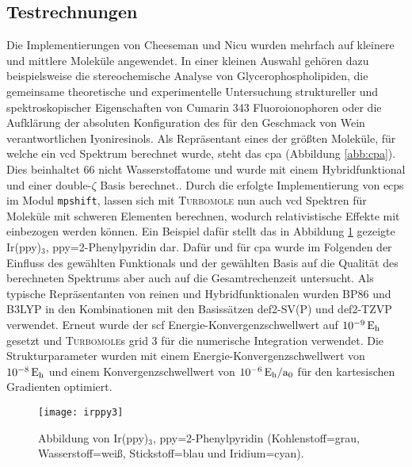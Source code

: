 	\subsection{Testrechnungen}
	Die Implementierungen von Cheeseman\supercite{cheeseman1996ab} und Nicu\supercite{nicu2008vibrational} wurden mehrfach auf kleinere und mittlere Moleküle angewendet. In einer kleinen Auswahl gehören dazu beispielsweise die stereochemische Analyse von Glycerophospholipiden\supercite{taniguchi2015stereochemical}, die gemeinsame theoretische und experimentelle Untersuchung struktureller und spektroskopischer Eigenschaften von Cumarin 343 Fluoroionophoren\supercite{botek2010theoretical} oder die Aufklärung der absoluten Konfiguration des für den Geschmack von Wein verantwortlichen Iyoniresinols.\supercite{cretin2015stereochemistry} Als Repräsentant eines der größten Moleküle, für welche ein \ac{vcd} Spektrum berechnet wurde, steht das \acf{cpa} (Abbildung \ref{abb:cpa}). Dies beinhaltet 66 nicht Wasserstoffatome und wurde mit einem Hybridfunktional und einer double-$\zeta$ Basis berechnet.\supercite{brotin2006vibrational}. Durch die erfolgte Implementierung von \acp{ecp} im Modul \texttt{mpshift}, lassen sich mit \textsc{Turbomole} nun auch \ac{vcd} Spektren für Moleküle mit schweren Elementen berechnen, wodurch relativistische Effekte mit einbezogen werden können. Ein Beispiel dafür stellt das in Abbildung \ref{abb:irppy3} gezeigte Ir(ppy)$_3$, ppy=2-Phenylpyridin dar. Dafür und für \ac{cpa} wurde im Folgenden der Einfluss des gewählten Funktionals und der gewählten Basis auf die Qualität des berechneten Spektrums aber auch auf die Gesamtrechenzeit untersucht. Als typische Repräsentanten von reinen und Hybridfunktionalen wurden BP86\supercite{perdew1986density,becke1988density} und B3LYP\supercite{becke1993density,lee1988development,stephens1994ab} in den Kombinationen mit den Basissätzen def2-SV(P) und def2-TZVP\supercite{weigend2005balanced} verwendet. Erneut wurde der \ac{scf} Energie-Konvergenzschwellwert auf $\unit[10^{-9}]{E_{\textrm{h}}}$ gesetzt und \textsc{Turbomole}s grid 3 für die numerische Integration\supercite{treutler1995efficient} verwendet. Die Strukturparameter wurden mit einem  Energie-Konvergenzschwellwert von $\unit[10^{-8}]{E_{\textrm{h}}}$ und einem Konvergenzschwellwert von $\unit[10^{-6}]{E_{\textrm{h}}/a_0}$ für den kartesischen Gradienten optimiert.
	
\begin{figure}[ht!]
	\centering
	\texttt{[image: irppy3]}
	\captionsetup{figurewithin = chapter}
	\captionsetup{font=small, labelfont=bf}\caption[Abbildung von Ir(ppy)$_3$]{Abbildung von Ir(ppy)$_3$, ppy=2-Phenylpyridin (Kohlenstoff=grau, Wasserstoff=weiß, Stickstoff=blau und Iridium=cyan).}
\label{abb:irppy3}
\end{figure}

